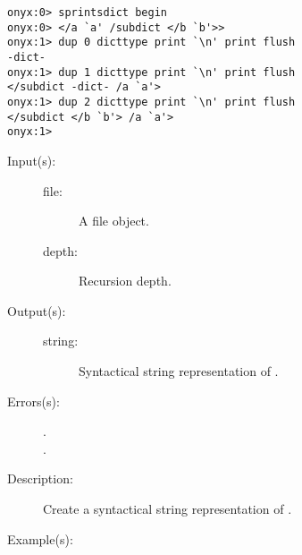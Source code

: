 \begin{description}
\begin{description}
\begin{verbatim}
onyx:0> sprintsdict begin
onyx:0> </a `a' /subdict </b `b'>>
onyx:1> dup 0 dicttype print `\n' print flush
-dict-
onyx:1> dup 1 dicttype print `\n' print flush
</subdict -dict- /a `a'>
onyx:1> dup 2 dicttype print `\n' print flush
</subdict </b `b'> /a `a'>
onyx:1>
		\end{verbatim}
	\end{description}
\label{sprintsdict:filetype}
\item[{\onyxop{file depth}{filetype}{string}}: ]
	\begin{description}\item[]
	\item[Input(s): ]
		\begin{description}\item[]
		\item[file: ]
			A file object.
		\item[depth: ]
			Recursion depth.
		\end{description}
	\item[Output(s): ]
		\begin{description}\item[]
		\item[string: ]
			Syntactical string representation of .
		\end{description}
	\item[Errors(s): ]
		\begin{description}\item[]
		\item[.]
		\item[.]
		\end{description}
	\item[Description: ]
		Create a syntactical string representation of .
	\item[Example(s): ]\begin{verbatim}


\end{verbatim}
\end{description}
\end{description}
